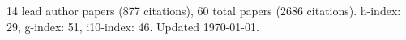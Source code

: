 14 lead author papers (877 citations),
60 total papers (2686 citations).\newline
h-index: 29, g-index: 51, i10-index: 46. Updated \today.